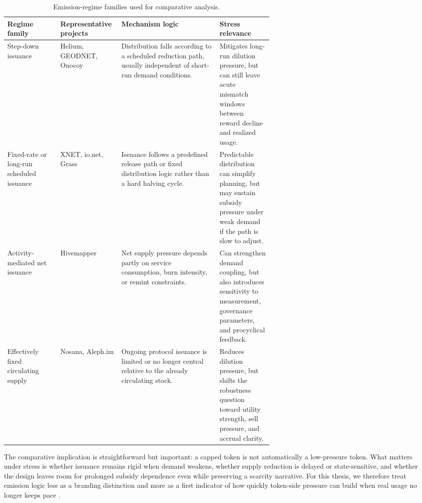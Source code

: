\begin{table}[H]
    \centering
    \small
    \renewcommand{\arraystretch}{1.25}
    \begin{tabularx}{\textwidth}{@{}>{\raggedright\arraybackslash}p{0.20\linewidth} >{\raggedright\arraybackslash}p{0.23\linewidth} X >{\raggedright\arraybackslash}p{0.20\linewidth}@{}}
        \toprule
        \textbf{Regime family} & \textbf{Representative projects} & \textbf{Mechanism logic} & \textbf{Stress relevance} \\
        \midrule
        Step-down issuance & Helium, GEODNET, Onocoy & Distribution falls according to a scheduled reduction path, usually independent of short-run demand conditions. & Mitigates long-run dilution pressure, but can still leave acute mismatch windows between reward decline and realized usage. \\
        \midrule
        Fixed-rate or long-run scheduled issuance & XNET, io.net, Grass & Issuance follows a predefined release path or fixed distribution logic rather than a hard halving cycle. & Predictable distribution can simplify planning, but may sustain subsidy pressure under weak demand if the path is slow to adjust. \\
        \midrule
        Activity-mediated net issuance & Hivemapper & Net supply pressure depends partly on service consumption, burn intensity, or remint constraints. & Can strengthen demand coupling, but also introduces sensitivity to measurement, governance parameters, and procyclical feedback. \\
        \midrule
        Effectively fixed circulating supply & Nosana, Aleph.im & Ongoing protocol issuance is limited or no longer central relative to the already circulating stock. & Reduces dilution pressure, but shifts the robustness question toward utility strength, sell pressure, and accrual clarity. \\
        \bottomrule
    \end{tabularx}
    \caption[Emission-regime families]{Emission-regime families used for comparative analysis.}
    \label{tab:v2_emission_regimes}
\end{table}

The comparative implication is straightforward but important: a capped token is not automatically a low-pressure token. What matters under stress is whether issuance remains rigid when demand weakens, whether supply reduction is delayed or state-sensitive, and whether the design leaves room for prolonged subsidy dependence even while preserving a scarcity narrative. For this thesis, we therefore treat emission logic less as a branding distinction and more as a first indicator of how quickly token-side pressure can build when real usage no longer keeps pace \cite{RenderBME, GeodnetIP7, IoNet2025, CoinMarketCapHM, OnocoyToken}.

